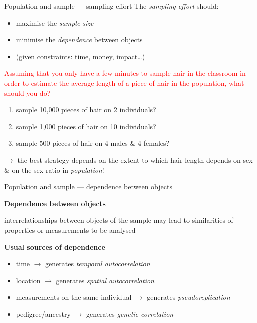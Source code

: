 \documentclass[
  ignorenonframetext,
  aspectratio=169,
  t]{beamer}
\providecommand{\tightlist}{%
  \setlength{\itemsep}{0pt}\setlength{\parskip}{0pt}}
\newcommand{\blueit}[1]{\textcolor{bluebeamer}{\emph{#1}}}
\newcommand{\bluebold}[1]{\textcolor{bluebeamer}{\textbf{#1}}}
\begin{document}
\begin{frame}{Population and sample --- sampling effort}
\protect{}\label{population-and-sample-sampling-effort}
The \blueit{sampling effort} should:

\begin{itemize}
\tightlist
\item
  maximise the \blueit{sample size}
\item
  minimise the \blueit{dependence} between objects
\item
  (given constraints: time, money, impact\ldots)
\end{itemize}

\pause

\vspace{0.5cm}

\textcolor{red}{Assuming that you only have a few minutes to sample hair in the classroom in order to estimate the average length of a piece of hair in the population, what should you do?}

\begin{enumerate}
\tightlist
\item
  sample 10,000 pieces of hair on 2 individuals?
\item
  sample 1,000 pieces of hair on 10 individuals?
\item
  sample 500 pieces of hair on 4 males \& 4 females?
\end{enumerate}

\pause

\vspace{0.5cm}

\(\rightarrow\) the best strategy depends on the extent to which hair
length depends on sex \& on the sex-ratio in \blueit{population}!
\end{frame}

\begin{frame}{Population and sample --- dependence between objects}
\protect{}\label{population-and-sample-dependence-between-objects}
\vspace{0.5cm}

\bluebold{Dependence between objects}

interrelationships between objects of the sample may lead to
similarities of properties or measurements to be analysed

\vspace{0.5cm}
\bluebold{Usual sources of dependence}

\begin{itemize}
\tightlist
\item
  time \(\rightarrow\) generates \blueit{temporal autocorrelation}
\item
  location \(\rightarrow\) generates \blueit{spatial autocorrelation}
\item
  measurements on the same individual \(\rightarrow\) generates
  \blueit{pseudoreplication}
\item
  pedigree/ancestry \(\rightarrow\) generates
  \blueit{genetic correlation}
\end{itemize}
\end{frame}
\end{document}
